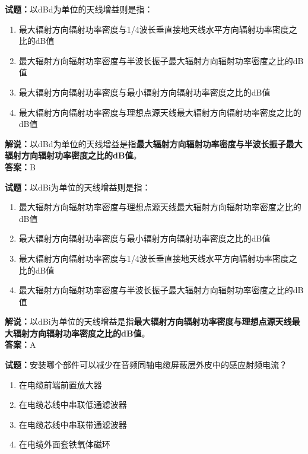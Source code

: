 \documentclass{ctexbook}
\begin{document}
\noindent\textbf{试题：}以dBd为单位的天线增益则是指：

\begin{enumerate}[leftmargin=3em]
	\item 最大辐射方向辐射功率密度与1/4波长垂直接地天线水平方向辐射功率密度之比的dB值
	\item 最大辐射方向辐射功率密度与半波长振子最大辐射方向辐射功率密度之比的dB值
	\item 最大辐射方向辐射功率密度与最小辐射方向辐射功率密度之比的dB值
	
	\item 最大辐射方向辐射功率密度与理想点源天线最大辐射方向辐射功率密度之比的dB值
\end{enumerate}

\noindent\textbf{解说：}以dBd为单位的天线增益是指\textbf{最大辐射方向辐射功率密度与半波长振子最大辐射方向辐射功率密度之比的dB值}。\\\noindent\textbf{答案：}B


\bigskip


\noindent\textbf{试题：}以dBi为单位的天线增益则是指：
\begin{enumerate}[leftmargin=3em]
	\item 最大辐射方向辐射功率密度与理想点源天线最大辐射方向辐射功率密度之比的dB值
	\item 最大辐射方向辐射功率密度与最小辐射方向辐射功率密度之比的dB值
	\item 最大辐射方向辐射功率密度与1/4波长垂直接地天线水平方向辐射功率密度之比的dB值
	\item 最大辐射方向辐射功率密度与半波长振子最大辐射方向辐射功率密度之比的dB值
\end{enumerate}

\noindent\textbf{解说：}以dBi为单位的天线增益是指\textbf{最大辐射方向辐射功率密度与理想点源天线最大辐射方向辐射功率密度之比的dB值}。\\\noindent\textbf{答案：}A


\bigskip


\noindent\textbf{试题：}安装哪个部件可以减少在音频同轴电缆屏蔽层外皮中的感应射频电流？

\begin{enumerate}[leftmargin=3em]
	\item 在电缆前端前置放大器
	\item 在电缆芯线中串联低通滤波器
	\item 在电缆芯线中串联带通滤波器	
	\item 在电缆外面套铁氧体磁环
\end{enumerate}
\end{document}
